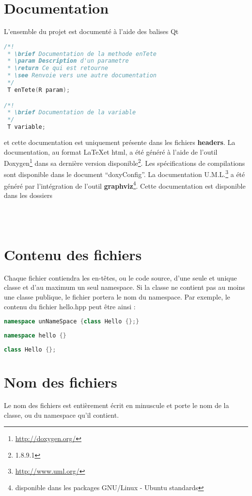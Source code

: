 \documentclass[a4paper,11pt]{report}
\begin{document}
\section{Documentation}
L'ensemble du projet est documenté à l'aide des balises Qt 
\begin{lstlisting}[frame=single,language=C++]
/*!
 * \brief Documentation de la methode enTete
 * \param Description d'un parametre
 * \return Ce qui est retourne
 * \see Renvoie vers une autre documentation
 */
 T enTete(R param);

/*!
 * \brief Documentation de la variable
 */
 T variable;
\end{lstlisting}
et cette documentation est uniquement présente dans les fichiers \textbf{headers}.
La documentation, au format \LaTeX et html, a été généré à l'aide de l'outil
Doxygen\footnote{\url{http://doxygen.org/}} dans sa dernière version
disponible\footnote{1.8.9.1}. Les spécifications de compilations sont disponible
dans le document ``doxyConfig''. La documentation
U.M.L.\footnote{\url{http://www.uml.org/}} a été généré par l'intégration de
l'outil \textbf{graphviz}\footnote{disponible dans les packages GNU/Linux -
Ubuntu standards}.
Cette documentation est disponible dans les dossiers
\begin{center}
 \\
 \\
\end{center}
\section{Contenu des fichiers}
Chaque fichier contiendra les en-têtes, ou le code source, d'une seule et unique
classe et d'au maximum un seul namespace. Si la classe ne contient pas au moins
une classe publique, le fichier portera le nom du namespace.
Par exemple, le contenu du fichier hello.hpp peut être ainsi :
\begin{lstlisting}[frame=single,language=C++]
namespace unNameSpace {class Hello {};}
\end{lstlisting}
\begin{lstlisting}[frame=single,language=C++]
namespace hello {}
\end{lstlisting}
\begin{lstlisting}[frame=single,language=C++]
class Hello {};
\end{lstlisting}
\section{Nom des fichiers}
Le nom des fichiers est entièrement écrit en minuscule et porte le nom de la
classe, ou du namespace qu'il contient.
\end{document}
